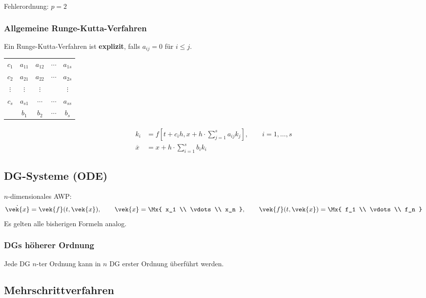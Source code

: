 			Fehlerordnung: $p=2$
		
		\subsubsection{Allgemeine Runge-Kutta-Verfahren}
			\label{allgrungekutta}
			Ein Runge-Kutta-Verfahren ist \textbf{explizit}, falls $a_{ij}=0$ für $i \leq j$. 
			
			\hspace{5ex}
			\begin{tabular}
				{c|cccc} $c_1$ & $a_{11}$ & $a_{12}$& $\cdots$& $a_{1s}$ \\
				$c_2$ & $a_{21}$ & $a_{22}$ & $\cdots$& $a_{2s}$ \\
				$\vdots$ & $\vdots$ & $\vdots$ & & $\vdots$ \\
				$c_s$ & $a_{s1}$ & $\cdots$ & $\cdots$ & $a_{ss}$ \\
				\hline & $b_1$ & $b_2$ & $\cdots$ & $b_s$\\
			\end{tabular}
			
			\begin{align*}
				k_i &= f\left[t+c_ih , x+h\cdot \sum_{j=1}^s a_{ij}k_j\right], \qquad i=1, \dots, s \\
				\overline{x} &= x + h \cdot \sum\limits_{i=1}^s b_ik_i
			\end{align*}

	\subsection{DG-Systeme (ODE)}
		$n$-dimensionales AWP:
		\[
			\dot{\vek{x}} = \vek{f}(t,\vek{x}), \qquad \vek{x} = \Mx{
				x_1 \\ \vdots \\ x_n
			}, \qquad \vek{f}(t,\vek{x}) = \Mx{
				f_1 \\ \vdots \\ f_n
			}
		\]
		Es gelten alle bisherigen Formeln analog. 
		
		\subsubsection{DGs höherer Ordnung}
			Jede DG $n$-ter Ordnung kann in $n$ DG erster Ordnung überführt werden.

	\subsection{Mehrschrittverfahren} 
